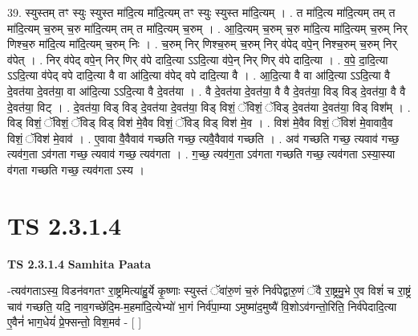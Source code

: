 \documentclass[17pt]{extarticle}
\begin{document}
39. स्युस्तम् तꣳ स्युः स्युस्त मा॑दि॒त्य मा॑दि॒त्यम् तꣳ स्युः स्युस्त मा॑दि॒त्यम् । . त मा॑दि॒त्य मा॑दि॒त्यम् तम् त मा॑दि॒त्यम् च॒रुम् च॒रु मा॑दि॒त्यम् तम् त मा॑दि॒त्यम् च॒रुम् । . आ॒दि॒त्यम् च॒रुम् च॒रु मा॑दि॒त्य मा॑दि॒त्यम् च॒रुम् निर् णिश्च॒रु मा॑दि॒त्य मा॑दि॒त्यम् च॒रुम् निः । . च॒रुम् निर् णिश्च॒रुम् च॒रुम् निर् व॑पेद् वपे॒न् निश्च॒रुम् च॒रुम् निर् व॑पेत् । . निर् व॑पेद् वपे॒न् निर् णिर् व॑पे दादि॒त्या ऽऽदि॒त्या व॑पे॒न् निर् णिर् व॑पे दादि॒त्या । . व॒पे॒ दा॒दि॒त्या ऽऽदि॒त्या व॑पेद् वपे दादि॒त्या वै वा आ॑दि॒त्या व॑पेद् वपे दादि॒त्या वै । . आ॒दि॒त्या वै वा आ॑दि॒त्या ऽऽदि॒त्या वै दे॒वत॑या दे॒वत॑या॒ वा आ॑दि॒त्या ऽऽदि॒त्या वै दे॒वत॑या । . वै दे॒वत॑या दे॒वत॑या॒ वै वै दे॒वत॑या॒ विड् विड् दे॒वत॑या॒ वै वै दे॒वत॑या॒ विट् । . दे॒वत॑या॒ विड् विड् दे॒वत॑या दे॒वत॑या॒ विड् विशं॒ ॅविशं॒ ॅविड् दे॒वत॑या दे॒वत॑या॒ विड् विश᳚म् । . विड् विशं॒ ॅविशं॒ ॅविड् विड् विश॑ मे॒वैव विशं॒ ॅविड् विड् विश॑ मे॒व । . विश॑ मे॒वैव विशं॒ ॅविश॑ मे॒वावावै॒व विशं॒ ॅविश॑ मे॒वाव॑ । . ए॒वावा वै॒वैवाव॑ गच्छति गच्छ॒ त्यवै॒वैवाव॑ गच्छति । . अव॑ गच्छति गच्छ॒ त्यवाव॑ गच्छ॒ त्यव॑ग॒ता ऽव॑गता गच्छ॒ त्यवाव॑ गच्छ॒ त्यव॑गता । . ग॒च्छ॒ त्यव॑ग॒ता ऽव॑गता गच्छति गच्छ॒ त्यव॑गता ऽस्या॒स्या व॑गता गच्छति गच्छ॒ त्यव॑गता ऽस्य । \newline
\pagebreak
{}

\section{ TS 2.3.1.4 }

\textbf{TS 2.3.1.4 } \newline
\textbf{Samhita Paata} \newline

-त्यव॑गताऽस्य॒ विडन॑वगतꣳ रा॒ष्ट्रमित्या॑हु॒र्ये कृ॒ष्णाः स्युस्तं ॅवा॑रु॒णं च॒रुं निर्व॑पेद्वारु॒णं ॅवै रा॒ष्ट्रमु॒भे ए॒व विशं॑ च रा॒ष्ट्रं चाव॑ गच्छति॒ यदि॒ नाव॒गच्छे॑दि॒म-म॒हमा॑दि॒त्येभ्यो॑ भा॒गं निर्व॑पा॒म्या ऽमुष्मा॑द॒मुष्यै॑ वि॒शोऽव॑गन्तो॒रिति॒ निर्व॑पेदादि॒त्या ए॒वैनं॑ भाग॒धेयं॑ प्रे॒फ्सन्तो॒ विश॒मव॑ - [  ] \newline
\end{document}
